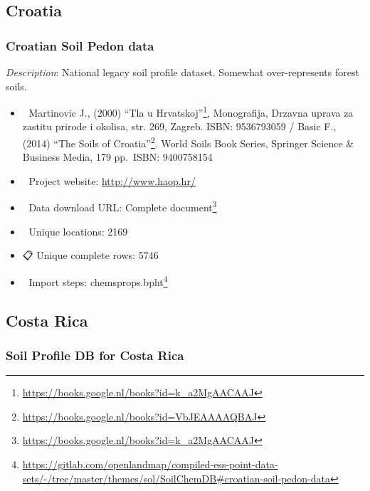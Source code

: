 \documentclass[
  graybox,natbib,nospthms]{svmono}
\providecommand{\tightlist}{%
  \setlength{\itemsep}{0pt}\setlength{\parskip}{0pt}}
\providecommand{\tightlist}{\setlength{\itemsep}{0pt}\setlength{\parskip}{0pt}}
\renewcommand{\href}[2]{#2 (\url{#1})}
\renewcommand{\href}[2]{#2\footnote{\url{#1}}}
\begin{document}
\hypertarget{croatia}{%
\subsection{Croatia}\label{croatia}}

\hypertarget{croatian-soil-pedon-data}{%
\subsubsection{Croatian Soil Pedon data}\label{croatian-soil-pedon-data}}

\emph{Description}: National legacy soil profile dataset. Somewhat over-represents forest soils.

\begin{itemize}
\tightlist
\item
  📕 Martinovic J., (2000) \href{https://books.google.nl/books?id=k_a2MgAACAAJ}{``Tla u Hrvatskoj''}, Monografija, Drzavna uprava za zastitu prirode i okolisa, str. 269, Zagreb. ISBN: 9536793059 / Basic F., (2014) \href{https://books.google.nl/books?id=VbJEAAAAQBAJ}{``The Soils of Croatia''}. World Soils Book Series, Springer Science \& Business Media, 179 pp.~ISBN: 9400758154\\
\item
  🔗 Project website: \url{http://www.haop.hr/}\\
\item
  📂 Data download URL: \href{https://books.google.nl/books?id=k_a2MgAACAAJ}{Complete document}\\
\item
  📍 Unique locations: 2169\\
\item
  📋 Unique complete rows: 5746\\
\item
  📝 Import steps: \href{https://gitlab.com/openlandmap/compiled-ess-point-data-sets/-/tree/master/themes/sol/SoilChemDB\#croatian-soil-pedon-data}{chemsprops.bpht}
\end{itemize}

\hypertarget{costa-rica}{%
\subsection{Costa Rica}\label{costa-rica}}

\hypertarget{soil-profile-db-for-costa-rica}{%
\subsubsection{Soil Profile DB for Costa Rica}\label{soil-profile-db-for-costa-rica}}
\end{document}
